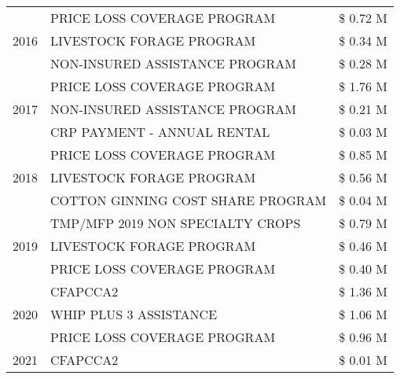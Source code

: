 \begin{tabular}{llr}
\cline{1-3}
\multirow[t]{3}{*}{2016} & PRICE LOSS COVERAGE PROGRAM & \$ 0.72 M \\
 & LIVESTOCK FORAGE PROGRAM & \$ 0.34 M \\
 & NON-INSURED ASSISTANCE PROGRAM & \$ 0.28 M \\
\cline{1-3}
\multirow[t]{3}{*}{2017} & PRICE LOSS COVERAGE PROGRAM & \$ 1.76 M \\
 & NON-INSURED ASSISTANCE PROGRAM & \$ 0.21 M \\
 & CRP PAYMENT - ANNUAL RENTAL & \$ 0.03 M \\
\cline{1-3}
\multirow[t]{3}{*}{2018} & PRICE LOSS COVERAGE PROGRAM & \$ 0.85 M \\
 & LIVESTOCK FORAGE PROGRAM & \$ 0.56 M \\
 & COTTON GINNING COST SHARE PROGRAM & \$ 0.04 M \\
\cline{1-3}
\multirow[t]{3}{*}{2019} & TMP/MFP 2019 NON SPECIALTY CROPS & \$ 0.79 M \\
 & LIVESTOCK FORAGE PROGRAM & \$ 0.46 M \\
 & PRICE LOSS COVERAGE PROGRAM & \$ 0.40 M \\
\cline{1-3}
\multirow[t]{3}{*}{2020} & CFAPCCA2 & \$ 1.36 M \\
 & WHIP PLUS 3 ASSISTANCE & \$ 1.06 M \\
 & PRICE LOSS COVERAGE PROGRAM & \$ 0.96 M \\
\cline{1-3}
2021 & CFAPCCA2 & \$ 0.01 M \\
\cline{1-3}
\bottomrule
\end{tabular}
